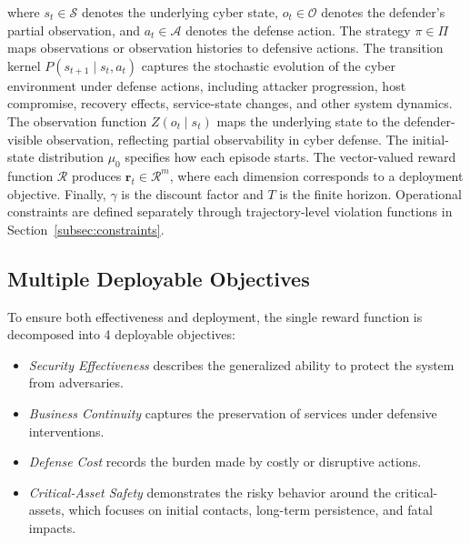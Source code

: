 \documentclass[sigconf,review,anonymous]{acmart}
\begin{document}
where \(s_t\in\mathcal{S}\) denotes the underlying cyber state,  \(o_t\in\mathcal{O}\) denotes the defender's partial observation, and \(a_t\in\mathcal{A}\) denotes the defense action. 
The strategy \(\pi\in\mathcal{\Pi}\) maps observations or observation histories to defensive actions.
The transition kernel \(P(s_{t+1}\mid s_t,a_t)\) captures the stochastic evolution of the cyber environment under defense actions, including attacker progression, host compromise, recovery effects, service-state changes, and other system dynamics. 
The observation function \(Z(o_t\mid s_t)\) maps the underlying state to the defender-visible observation, reflecting partial observability in cyber defense. 
The initial-state distribution \(\mu_0\) specifies how each episode starts. 
The vector-valued reward function \(\mathcal{R}\) produces \(\mathbf{r}_t\in\mathcal{R}^m\), where each dimension corresponds to a deployment objective. 
Finally, \(\gamma\) is the discount factor and \(T\) is the finite horizon. Operational
constraints are defined separately through trajectory-level violation
functions in Section~\ref{subsec:constraints}.


\subsection{Multiple Deployable Objectives}
\label{subsec:objectives}
To ensure both effectiveness and deployment, the single reward function is decomposed into 4 deployable objectives:
\begin{itemize}
    \item \emph{Security Effectiveness} describes the generalized ability to protect the system from adversaries.
    \item \emph{Business Continuity} captures the preservation of services under defensive interventions. 
    \item \emph{Defense Cost} records the burden made by costly or disruptive actions. 
    \item \emph{Critical-Asset Safety} demonstrates the risky behavior around the critical-assets, which focuses on initial contacts, long-term persistence, and fatal impacts.
\end{itemize}
\end{document}
